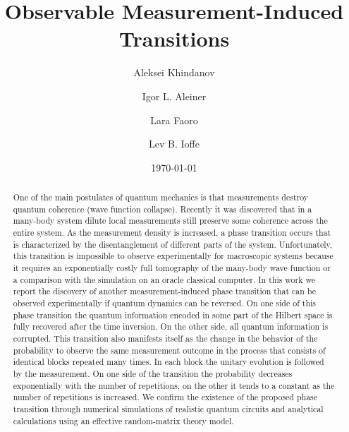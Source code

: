 \documentclass[%
 reprint,
 superscriptaddress,
 amsmath,amssymb,
prx,
]{revtex4-2}\href{\href{}{}}{}
\begin{document}

\title{Observable Measurement-Induced Transitions}%

\author{Aleksei Khindanov}

\author{Igor L. Aleiner}

\author{Lara Faoro}

\author{Lev B. Ioffe}




\date{\today}

\begin{abstract}


One of the main postulates of quantum mechanics is that measurements destroy quantum coherence (wave function collapse). Recently it was discovered that in a many-body system dilute local measurements still preserve some coherence across the entire system. As the measurement density is increased, a phase transition occurs that is characterized by the disentanglement of different parts of the system. Unfortunately, this transition is impossible to observe experimentally for macroscopic systems because it requires an exponentially costly full tomography of the many-body wave function or a comparison with the simulation on an oracle classical computer. In this work we report the discovery of another measurement-induced phase transition that can be observed experimentally if quantum dynamics can be reversed. On one side of this phase transition the quantum information encoded in some part of the Hilbert space is fully recovered after the time inversion.  On the other side, all quantum information is corrupted. This transition also manifests itself as the change in the behavior of the probability to observe the same measurement outcome in the process that consists of identical blocks repeated many times. In each block the unitary evolution is followed by the measurement. On one side of the transition the probability decreases exponentially with the number of repetitions, on the other it tends to a constant as the number of repetitions is increased. We confirm the existence of the proposed phase transition through numerical simulations of realistic quantum circuits and analytical calculations using an effective random-matrix theory model.


\end{abstract}
\end{document}
